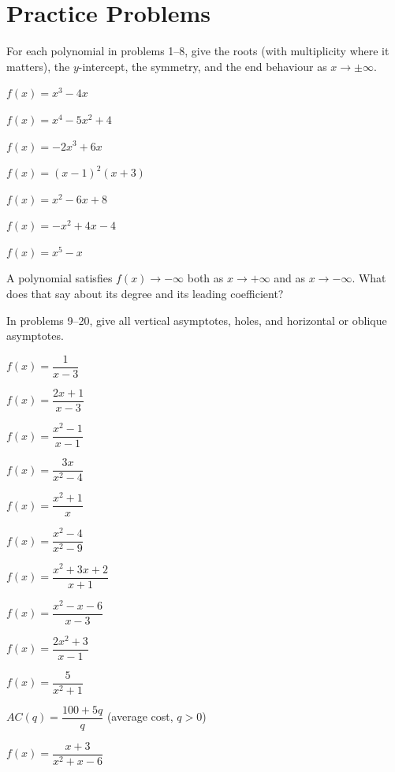\section{Practice Problems}

For each polynomial in problems 1--8, give the roots (with multiplicity
where it matters), the $y$-intercept, the symmetry, and the end behaviour
as $x\to\pm\infty$.

\begin{problems}
  \item $f(x)=x^{3}-4x$
  \item $f(x)=x^{4}-5x^{2}+4$
  \item $f(x)=-2x^{3}+6x$
  \item $f(x)=(x-1)^{2}(x+3)$
  \item $f(x)=x^{2}-6x+8$
  \item $f(x)=-x^{2}+4x-4$
  \item $f(x)=x^{5}-x$
  \item A polynomial satisfies $f(x)\to-\infty$ both as $x\to+\infty$ and
        as $x\to-\infty$. What does that say about its degree and its
        leading coefficient?
\end{problems}

In problems 9--20, give all vertical asymptotes, holes, and horizontal or
oblique asymptotes.

\begin{problems}[resume]
  \item $f(x)=\dfrac{1}{x-3}$
  \item $f(x)=\dfrac{2x+1}{x-3}$
  \item $f(x)=\dfrac{x^{2}-1}{x-1}$
  \item $f(x)=\dfrac{3x}{x^{2}-4}$
  \item $f(x)=\dfrac{x^{2}+1}{x}$
  \item $f(x)=\dfrac{x^{2}-4}{x^{2}-9}$
  \item $f(x)=\dfrac{x^{2}+3x+2}{x+1}$
  \item $f(x)=\dfrac{x^{2}-x-6}{x-3}$
  \item $f(x)=\dfrac{2x^{2}+3}{x-1}$
  \item $f(x)=\dfrac{5}{x^{2}+1}$
  \item $AC(q)=\dfrac{100+5q}{q}$ \;(average cost, $q>0$)
  \item $f(x)=\dfrac{x+3}{x^{2}+x-6}$
\end{problems}

